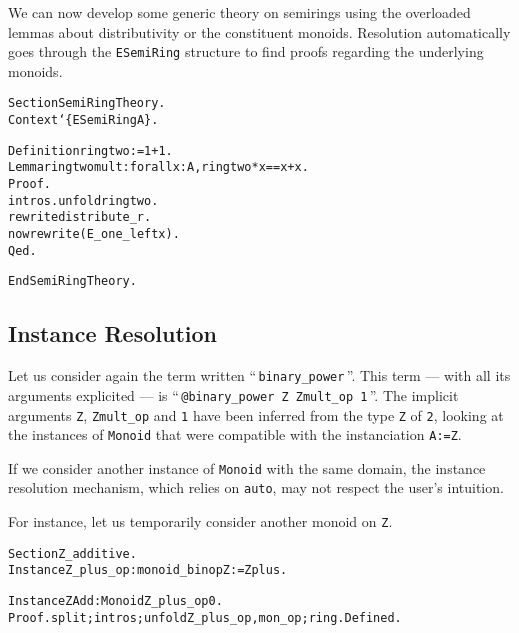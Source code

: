 \documentclass[a4]{report}
\newcommand{\applis}[1]{\mbox{\texttt{#1}}}
\begin{document}
We can now develop some generic theory on semirings using the overloaded
lemmas about distributivity or the constituent monoids. Resolution
automatically goes through the \texttt{ESemiRing} structure to find
proofs regarding the underlying monoids.

\begin{alltt}
Section SemiRingTheory.
  Context `\{ESemiRing A\}.

  Definition ringtwo := 1 + 1.
  Lemma ringtwomult : forall x : A, ringtwo * x == x + x.
  Proof.
    intros. unfold ringtwo.
    rewrite distribute_r.
    now rewrite (E_one_left x).
  Qed.

End SemiRingTheory.
\end{alltt}

\subsection{Instance Resolution}
Let us consider again the term written ``\,\applis{binary\_power}\,''.
This term --- with all its arguments explicited --- is ``\,\applis{@binary\_power Z Zmult\_op 1}\,''. The implicit arguments
\texttt{Z}, \texttt{Zmult\_op} and \texttt{1} have been inferred 
from the type \texttt{Z} of \texttt{2}, looking at the instances
of \texttt{Monoid} that were compatible with the instanciation
\texttt{A:=Z}. 
 

If we consider another instance of \texttt{Monoid} with the same 
domain, the instance resolution mechanism, which relies on \texttt{auto},
may not respect the user's intuition. 

For instance, let us temporarily consider another monoid on \texttt{Z}.

\begin{alltt}
Section Z_additive.
  Instance Z_plus_op : monoid_binop Z := Zplus.

  Instance ZAdd : Monoid Z_plus_op 0. 
  Proof. split;intros;unfold Z_plus_op, mon_op;ring. Defined.
\end{alltt}
\end{document}
